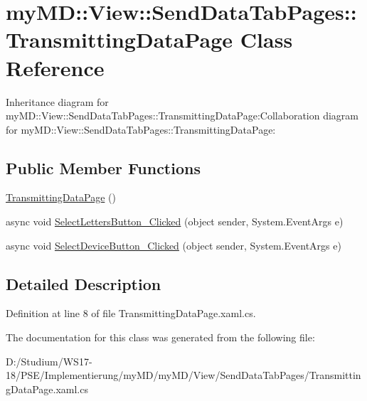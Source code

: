 \hypertarget{classmy_m_d_1_1_view_1_1_send_data_tab_pages_1_1_transmitting_data_page}{
\section{my\-MD::View::Send\-Data\-Tab\-Pages::Transmitting\-Data\-Page Class Reference}
\label{d2/dff/classmy_m_d_1_1_view_1_1_send_data_tab_pages_1_1_transmitting_data_page}
}
Inheritance diagram for my\-MD::View::Send\-Data\-Tab\-Pages::Transmitting\-Data\-Page:Collaboration diagram for my\-MD::View::Send\-Data\-Tab\-Pages::Transmitting\-Data\-Page:\subsection*{Public Member Functions}
\begin{CompactItemize}
\item 
\hypertarget{classmy_m_d_1_1_view_1_1_send_data_tab_pages_1_1_transmitting_data_page_270cfa84823e4e9aea7a8a47e5e10072}{
\hyperlink{classmy_m_d_1_1_view_1_1_send_data_tab_pages_1_1_transmitting_data_page_270cfa84823e4e9aea7a8a47e5e10072}{Transmitting\-Data\-Page} ()}
\label{d2/dff/classmy_m_d_1_1_view_1_1_send_data_tab_pages_1_1_transmitting_data_page_270cfa84823e4e9aea7a8a47e5e10072}

\item 
\hypertarget{classmy_m_d_1_1_view_1_1_send_data_tab_pages_1_1_transmitting_data_page_98026a15acc334672e0a5a418be597ab}{
async void \hyperlink{classmy_m_d_1_1_view_1_1_send_data_tab_pages_1_1_transmitting_data_page_98026a15acc334672e0a5a418be597ab}{Select\-Letters\-Button\_\-Clicked} (object sender, System.Event\-Args e)}
\label{d2/dff/classmy_m_d_1_1_view_1_1_send_data_tab_pages_1_1_transmitting_data_page_98026a15acc334672e0a5a418be597ab}

\item 
\hypertarget{classmy_m_d_1_1_view_1_1_send_data_tab_pages_1_1_transmitting_data_page_ae8938e9281c870f4dcf26df21924900}{
async void \hyperlink{classmy_m_d_1_1_view_1_1_send_data_tab_pages_1_1_transmitting_data_page_ae8938e9281c870f4dcf26df21924900}{Select\-Device\-Button\_\-Clicked} (object sender, System.Event\-Args e)}
\label{d2/dff/classmy_m_d_1_1_view_1_1_send_data_tab_pages_1_1_transmitting_data_page_ae8938e9281c870f4dcf26df21924900}

\end{CompactItemize}


\subsection{Detailed Description}




Definition at line 8 of file Transmitting\-Data\-Page.xaml.cs.

The documentation for this class was generated from the following file:\begin{CompactItemize}
\item 
D:/Studium/WS17-18/PSE/Implementierung/my\-MD/my\-MD/View/Send\-Data\-Tab\-Pages/Transmitting\-Data\-Page.xaml.cs\end{CompactItemize}

